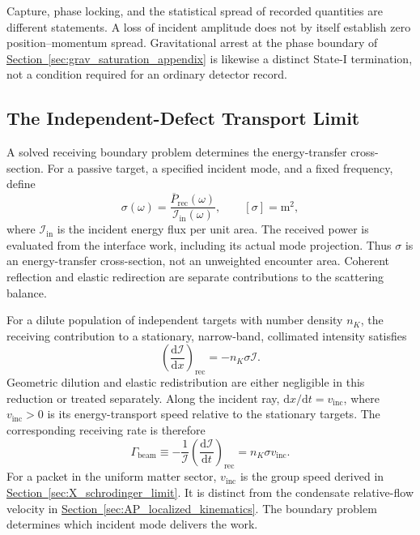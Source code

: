 Capture, phase locking, and the statistical spread of recorded quantities are different statements. A loss of incident amplitude does not by itself establish zero position--momentum spread. Gravitational arrest at the phase boundary of \hyperref[sec:grav_saturation_appendix]{Section~\ref*{sec:grav_saturation_appendix}} is likewise a distinct State-I termination, not a condition required for an ordinary detector record.

\subsection{The Independent-Defect Transport Limit}
\label{sec:Y_kinetic_limit}

A solved receiving boundary problem determines the energy-transfer cross-section. For a passive target, a specified incident mode, and a fixed frequency, define
\begin{equation}
    \sigma(\omega)
    =\frac{\overline P_{\mathrm{rec}}(\omega)}
    {\mathcal I_{\mathrm{in}}(\omega)},
    \qquad [\sigma]=\mathrm m^2,
    \label{eq:Y_energy_cross_section}
\end{equation}
where $\mathcal I_{\mathrm{in}}$ is the incident energy flux per unit area. The received power is evaluated from the interface work, including its actual mode projection. Thus $\sigma$ is an energy-transfer cross-section, not an unweighted encounter area. Coherent reflection and elastic redirection are separate contributions to the scattering balance.

For a dilute population of independent targets with number density $n_K$, the receiving contribution to a stationary, narrow-band, collimated intensity satisfies
\begin{equation}
    \left(\frac{\mathrm d\mathcal I}{\mathrm dx}\right)_{\!\mathrm{rec}}
    =-n_K\sigma\mathcal I.
\end{equation}
Geometric dilution and elastic redistribution are either negligible in this reduction or treated separately. Along the incident ray, $\mathrm dx/\mathrm dt=v_{\mathrm{inc}}$, where $v_{\mathrm{inc}}>0$ is its energy-transport speed relative to the stationary targets. The corresponding receiving rate is therefore
\begin{equation}
    \boxed{
    \Gamma_{\mathrm{beam}}
    \equiv-\frac{1}{\mathcal I}
    \left(\frac{\mathrm d\mathcal I}{\mathrm dt}\right)_{\!\mathrm{rec}}
    =n_K\sigma v_{\mathrm{inc}}
    }.
    \label{eq:Y_kinetic_rate_general}
\end{equation}
For a packet in the uniform matter sector, $v_{\mathrm{inc}}$ is the group speed derived in \hyperref[sec:X_schrodinger_limit]{Section~\ref*{sec:X_schrodinger_limit}}. It is distinct from the condensate relative-flow velocity in \hyperref[sec:AP_localized_kinematics]{Section~\ref*{sec:AP_localized_kinematics}}. The boundary problem determines which incident mode delivers the work.


